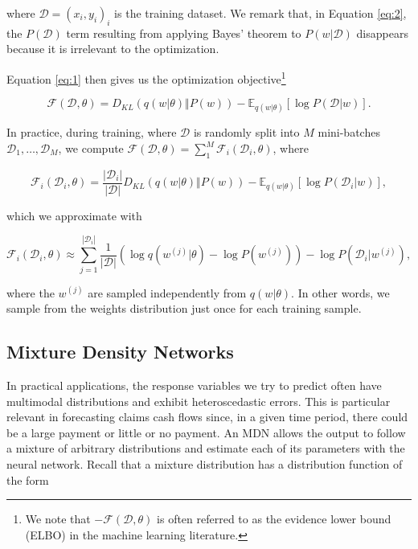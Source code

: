 \documentclass{article}
\begin{document}
where $\mathcal{D} = (x_i, y_i)_i$ is the training dataset. We remark that, in Equation \ref{eq:2}, the $P(\mathcal{D})$ term resulting from applying Bayes' theorem to $P(w|\mathcal{D})$ disappears because it is irrelevant to the optimization.

Equation \ref{eq:1} then gives us the optimization objective\footnote{We note that $-\mathcal{F}(\mathcal{D}, \theta)$ is often referred to as the evidence lower bound (ELBO) in the machine learning literature.}

\begin{equation}
    \mathcal{F}(\mathcal{D}, \theta) = D_{KL}(q(w|\theta) \Vert P(w)) - \mathbb{E}_{q(w|\theta)}[\log P(\mathcal{D}|w)].
\end{equation}

In practice, during
training, where $\mathcal{D}$ is randomly split into $M$ mini-batches
$\mathcal{D}_1,\dots,\mathcal{D}_M$, we compute 
$\mathcal{F}(\mathcal{D}, \theta) = \sum_1^M \mathcal{F}_i(\mathcal{D}_i, \theta)$, 
where

\begin{equation}
    \mathcal{F}_i(\mathcal{D}_i, \theta) = \frac{|\mathcal{D}_i|}{|\mathcal{D}|}D_{KL}(q(w|\theta) \Vert P(w)) - \mathbb{E}_{q(w|\theta)}[\log P(\mathcal{D}_i|w)],
\end{equation}

which we approximate with

\begin{equation}
    \mathcal{F}_i(\mathcal{D}_i, \theta) \approx \sum_{j=1}^{|\mathcal{D}_i|} \frac{1}{|\mathcal{D}|} ( \log q(w^{(j)}|\theta) - \log P(w^{(j)}) ) - \log P(\mathcal{D}_i|w^{(j)}),
\end{equation}

where the $w^{(j)}$ are sampled independently from $q(w|\theta)$. In other
words, we sample from the weights distribution just once for each training 
sample.

\subsection{Mixture Density Networks}\label{section:mdn}

In practical applications, the response variables we try to predict often have
multimodal distributions and exhibit heteroscedastic errors. This is particular 
relevant in forecasting claims cash flows since, in a given time period, there 
could be a large payment or little or no payment. An MDN allows the output to
follow a mixture of arbitrary distributions and estimate each of its parameters 
with the neural network. Recall that a mixture distribution has a distribution 
function of the form
\end{document}
